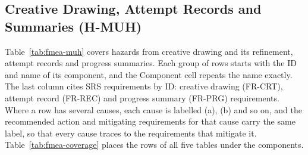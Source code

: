 \documentclass{article}
\begin{document}
\subsection{Creative Drawing, Attempt Records and Summaries
(H-MUH)}\label{sec:fmea-muh}

Table~\ref{tab:fmea-muh} covers hazards from creative drawing and its
refinement, attempt records and progress summaries. Each group of rows starts
with the ID and name of its component, and the Component cell repeats the name
exactly. The last column cites SRS requirements by ID: creative drawing
(FR-CRT), attempt record (FR-REC) and progress summary (FR-PRG) requirements.
Where a row has several causes, each cause is labelled (a), (b) and so on, and
the recommended action and mitigating requirements for that cause carry the same
label, so that every cause traces to the requirements that mitigate it.
Table~\ref{tab:fmea-coverage} places the rows of all five tables under the
components.
\end{document}
